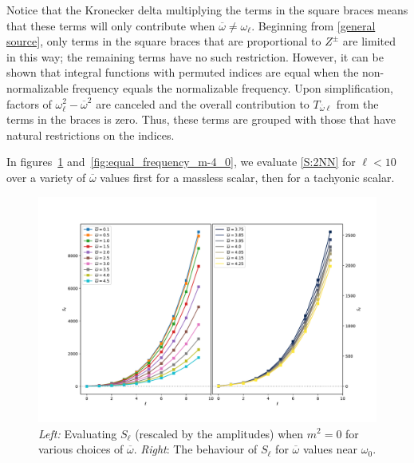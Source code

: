 \documentclass[letterpaper,11pt]{article}
\newcommand{\ol}{\omega_\ell}
\newcommand{\ob}{\overline{\omega}}
\begin{document}
Notice that the Kronecker delta multiplying the terms in the square braces means that these terms will only contribute when $\ob \neq \ol$. Beginning from \eqref{general source}, only terms in the square braces that are proportional to $Z^{\pm}$ are limited in this way; the remaining terms have no such restriction. However, it can be shown that integral functions with permuted indices are equal when the non-normalizable frequency equals the normalizable frequency. Upon simplification, factors of $\ol^2 - \ob^2$ are canceled and the overall contribution to $T_{\ob \ell}$ from the terms in the braces is zero. Thus, these terms are grouped with those that have natural restrictions on the indices. 

In figures~\ref{fig:equal_frequency_m0} and~\ref{fig:equal_frequency_m-4_0}, we evaluate \eqref{S:2NN} for $\ell < 10$ over a variety of $\ob$ values first for a massless scalar, then for a tachyonic scalar.

\begin{figure}
\centering
\includegraphics[width=\textwidth]{./figures/NN_equalfreq_sourceterms_m0_0+zoom}
\caption{{\it Left:} Evaluating $S_\ell$ (rescaled by the amplitudes) when $m^2 = 0$ for various choices of $\ob$. {\it Right}: The behaviour of $S_\ell$ for $\ob$ values near $\omega_0$.}
\label{fig:equal_frequency_m0}
\end{figure}
\end{document}
